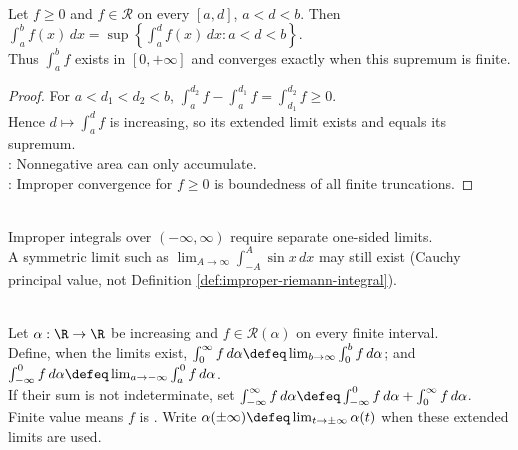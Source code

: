 \begin{theorem} \label{thm:nonnegative-improper-integral-supremum} \\
Let $f\geq0$ and $f\in\mathcal{R}$ on every $[a,d]$, $a<d<b$. Then $\int_a^b f(x)\,dx=\sup\left\{\int_a^d f(x)\,dx:a<d<b\right\}$.\\
Thus $\int_a^b f$ exists in $[0,+\infty]$ and converges exactly when this supremum is finite.
\begin{proof}
For $a<d_1<d_2<b$, $\int_a^{d_2}f-\int_a^{d_1}f=\int_{d_1}^{d_2}f\geq0$.\\
Hence $d\mapsto\int_a^d f$ is increasing, so its extended limit exists and equals its supremum.\\
: Nonnegative area can only accumulate.\\
: Improper convergence for $f\geq0$ is boundedness of all finite truncations.
\end{proof}
\end{theorem}

\begin{perspective} \label{per:cauchy-principal-value-not-improper-integral} \\
Improper integrals over $(-\infty,\infty)$ require separate one-sided limits.\\
A symmetric limit such as $\lim_{A\to\infty}\int_{-A}^{A}\sin x\,dx$ may still exist (Cauchy principal value, not Definition \ref{def:improper-riemann-integral}).
\end{perspective}

\begin{definition} \label{def:improper-riemann-stieltjes-real-line} \\
Let $\alpha:\R\to\R$ be increasing and $f\in\mathcal{R}(\alpha)$ on every finite interval.\\
Define, when the limits exist, $\int_0^\infty f\,d\alpha\defeq\lim_{b\to\infty}\int_0^b f\,d\alpha$; and $\int_{-\infty}^{0} f\,d\alpha\defeq\lim_{a\to-\infty}\int_a^0 f\,d\alpha$.\\
If their sum is not indeterminate, set $\int_{-\infty}^{\infty}f\,d\alpha \defeq \int_{-\infty}^{0}f\,d\alpha+\int_0^\infty f\,d\alpha$.\\
Finite value means $f$ is . Write $\alpha(\pm\infty)\defeq\lim_{t\to\pm\infty}\alpha(t)$ when these extended limits are used.
\end{definition}

